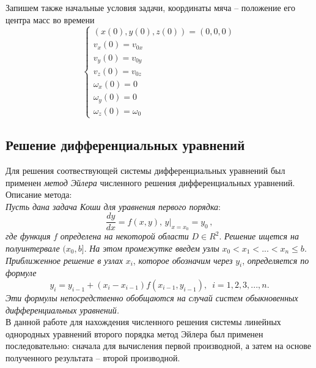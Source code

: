 \documentclass[a5paper, 10pt]{article}
\theoremstyle{definition}
\theoremstyle{plain}
\theoremstyle{remark}
\begin{document}
Запишем также начальные условия задачи, координаты мяча -- положение его центра масс во времени
\begin{equation}
\begin{cases}
\left(x (0), y(0), z(0) \right)  = \left(0, 0, 0\right)\\
v_{x} (0) = v_{0x}\\
v_{y} (0) = v_{0y}\\
v_{z} (0) = v_{0z}\\
\omega_{x} (0) = 0\\
\omega_{y} (0) = 0\\
\omega_{z} (0) = \omega_{0}
\end{cases}
\end{equation}
\subsection{Решение дифференциальных уравнений}
Для решения соотвествующей системы дифференциальных уравнений был применен \textit{метод Эйлера} численного решения дифференциальных уравнений. Описание метода:\\
\textit{Пусть дана задача Коши для уравнения первого порядка}:
$$ \frac{dy}{dx} = f(x, y), \, \left. y \right|_{x = x_0} = y_0 \, ,$$
\textit{где функция} $f$ \textit{определена на некоторой области} $D \in R^2$. \textit{Решение ищется на полуинтервале} $(x_0, b]$. \textit{На этом промежутке введем узлы} $x_0 < x_1 < ... < x_n \leq b$. \textit{Приближенное решение в узлах} $x_i$, \textit{которое обозначим через} $y_i$,  \textit{определяется по формуле}
$$y_i = y_{i-1} + (x_i - x_{i-1}) f(x_{i-1}, y_{i-1}), \, \, \, i = 1, 2, 3, ..., n.$$
\textit{Эти формулы непосредственно обобщаются на случай систем обыкновенных дифференциальных уравнений.}\\
В данной работе для нахождения численного решения системы линейных однородных уравнений второго порядка метод Эйлера был применен последовательно: сначала для вычисления первой производной, а затем на основе полученного результата -- второй производной.
\end{document}
